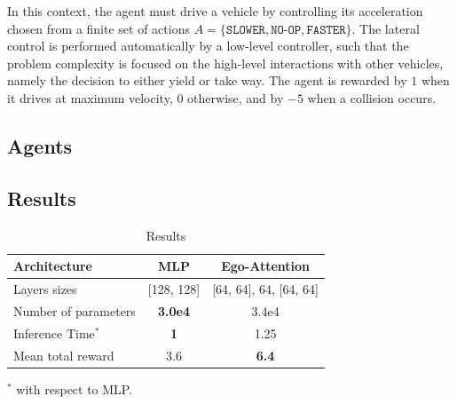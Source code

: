 \documentclass{article}
\begin{document}
{In this context, the agent must drive a vehicle by controlling its acceleration chosen from a finite set of actions $A = \{\texttt{SLOWER}, \texttt{NO-OP}, \texttt{FASTER}\}$. The lateral control is performed automatically by a low-level controller, such that the problem complexity is focused on the high-level interactions with other vehicles, namely the decision to either yield or take way. The agent is rewarded by $1$ when it drives at maximum velocity, $0$ otherwise, and by $-5$ when a collision occurs.

\subsection{Agents}

\subsection{Results}


\begin{table}
	\centering
	\begin{threeparttable}
    \caption{Results}
	\begin{tabular}{lcc}
		\toprule
		Architecture & MLP & Ego-Attention \\
		\midrule 
		Layers sizes & [128, 128] & [64, 64], 64, [64, 64] \\
		Number of parameters & \textbf{3.0e4} & 3.4e4 \\
		Inference Time$^*$ & \textbf{1} & 1.25 \\
		Mean total reward & 3.6 & \textbf{6.4} \\ 
		\bottomrule
	\end{tabular}
	\begin{tablenotes}
		\small
		\item $^*$ with respect to MLP.
	\end{tablenotes}
	\end{threeparttable}
\end{table}

}
\end{document}
